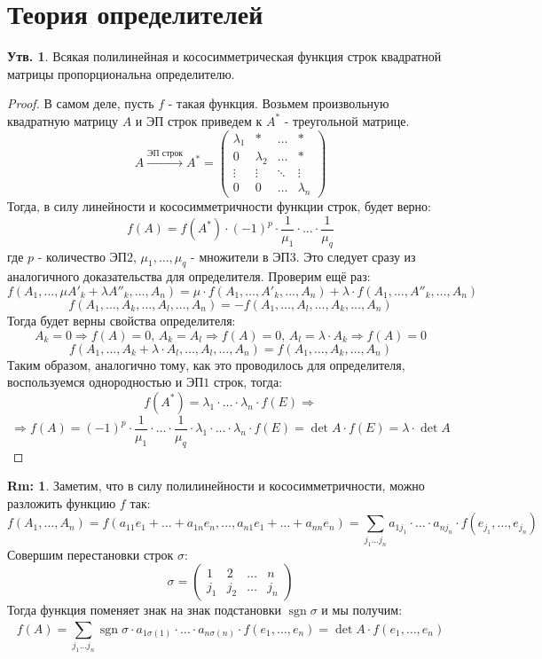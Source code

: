 \documentclass[12pt]{article}
\newcommand{\RN}[1]{%
	\textup{\uppercase\expandafter{\romannumeral#1}}%
}
\theoremstyle{definition}
\newtheorem{rem}{Rm:}
\newtheorem{prop}{Утв.}
\DeclareMathOperator{\sgn}{sgn}
\newcommand{\ddsum}[2]{\displaystyle\sum\limits_{#1}^{#2}}
\begin{document}
\lhead{Алгебра-\RN{1}}
\section*{Теория определителей}

\begin{prop}
	Всякая полилинейная и кососимметрическая функция строк квадратной матрицы пропорциональна определителю.
\end{prop}
\begin{proof}
	В самом деле, пусть $f$ - такая функция. Возьмем произвольную квадратную матрицу $A$ и ЭП строк приведем к $A^*$ - треугольной матрице.
	$$
		A \xrightarrow{\text{ЭП строк}} A^* = 
		\begin{pmatrix}
			\lambda_1 & * & \dotsc & * \\
			0 & \lambda_2 &  \dotsc & *\\
			\vdots & \vdots & \ddots & \vdots\\
			0 & 0 & \dotsc & \lambda_n
		\end{pmatrix}
	$$
	Тогда, в силу линейности и кососимметричности функции строк, будет верно:
	$$
		f(A) = f(A^*){\cdot}(-1)^p{\cdot}\dfrac{1}{\mu_1}{\cdot}\dotsc{\cdot}\dfrac{1}{\mu_q}
	$$
	где $p$ - количество ЭП$2$, $\mu_1,\dotsc, \mu_q$ - множители в ЭП$3$. Это следует сразу из аналогичного доказательства для определителя. Проверим ещё раз:
	$$
		f(A_1, \dotsc, \mu A'_k + \lambda A''_k,\dotsc, A_n) = \mu{\cdot}f(A_1,\dotsc, A'_k, \dotsc, A_n) + \lambda{\cdot}f(A_1,\dotsc, A''_k, \dotsc, A_n)
	$$
	$$
		f(A_1,\dotsc, A_k, \dotsc, A_l, \dotsc, A_n) = -f(A_1,\dotsc, A_l, \dotsc,A_k, \dotsc, A_n)
	$$
	Тогда будет верны свойства определителя: 
	$$
		A_k = 0  \Rightarrow f(A) = 0, \, A_k = A_l \Rightarrow f(A) = 0, \, A_l = \lambda{\cdot}A_k \Rightarrow f(A) = 0
	$$
	$$
		f(A_1, \dotsc,A_k + \lambda{\cdot}A_l,\dotsc, A_l,\dotsc, A_n) = f(A_1,\dotsc, A_k, \dotsc, A_n)
	$$
	Таким образом, аналогично тому, как это проводилось для определителя, воспользуемся однородностью и ЭП$1$ строк, тогда:
	$$
		f(A^*) = \lambda_1{\cdot}\dotsc{\cdot}\lambda_n{\cdot}f(E) \Rightarrow
	$$
	$$
		\Rightarrow f(A) = (-1)^p{\cdot}\dfrac{1}{\mu_1}{\cdot}\dotsc{\cdot}\dfrac{1}{\mu_q}{\cdot}\lambda_1{\cdot}\dotsc{\cdot}\lambda_n{\cdot}f(E) = \det{A}{\cdot}f(E) = \lambda{\cdot}\det{A}
	$$
\end{proof}
\begin{rem}
	Заметим, что в силу полилинейности и кососимметричности, можно разложить функцию $f$ так:
	$$
		f(A_1,\dotsc,A_n) = f(a_{11}e_1 + \dotsc + a_{1n}e_n, \dotsc, a_{n1}e_1 + \dotsc + a_{nn}e_n) = \ddsum{j_1\dotsc j_n}{}a_{1j_1}{\cdot}\dotsc{\cdot}a_{nj_n}{\cdot}f(e_{j_1},\dotsc,e_{j_n})
	$$
	Совершим перестановки строк $\sigma$:
	$$
		\sigma = \begin{pmatrix}
			1 & 2 & \dotsc & n\\
			j_1 & j_2 & \dotsc & j_n
		\end{pmatrix}
	$$
	Тогда функция поменяет знак на знак подстановки $\sgn{\sigma}$ и мы получим:
	$$
		f(A) = \ddsum{j_1\dotsc j_n}{}\sgn{\sigma}{\cdot}a_{1\sigma(1)}{\cdot}\dotsc{\cdot}a_{n\sigma(n)}{\cdot}f(e_{1},\dotsc,e_{n}) = \det{A}{\cdot}f(e_{1},\dotsc,e_{n})
	$$
\end{rem}
\end{document}
